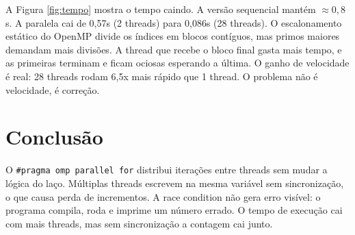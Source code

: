 \documentclass[11pt,letterpaper]{article}
\begin{document}
A Figura \ref{fig:tempo} mostra o tempo caindo. A versão sequencial mantém \(\approx 0{,}8\)s. A paralela cai de 0,57s (2 threads) para 0,086s (28 threads). O escalonamento estático do OpenMP divide os índices em blocos contíguos, mas primos maiores demandam mais divisões. A thread que recebe o bloco final gasta mais tempo, e as primeiras terminam e ficam ociosas esperando a última. O ganho de velocidade é real: 28 threads rodam 6,5x mais rápido que 1 thread. O problema não é velocidade, é correção.

\section{Conclusão}

O \texttt{\#pragma omp parallel for} distribui iterações entre threads sem mudar a lógica do laço. Múltiplas threads escrevem na mesma variável sem sincronização, o que causa perda de incrementos. A race condition não gera erro visível: o programa compila, roda e imprime um número errado. O tempo de execução cai com mais threads, mas sem sincronização a contagem cai junto.
\end{document}
